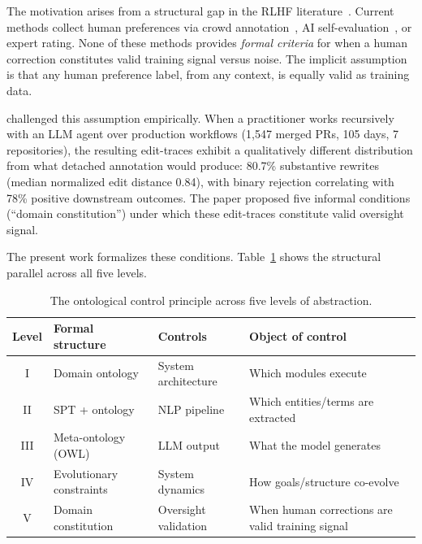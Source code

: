 \documentclass[11pt]{article}
\begin{document}
The motivation arises from a structural gap in the RLHF literature~\citep{christiano2017deep, ouyang2022training}.
Current methods collect human preferences via crowd annotation~\citep{ouyang2022training}, AI self-evaluation~\citep{bai2022constitutional, lee2023rlaif}, or expert rating.
None of these methods provides \emph{formal criteria} for when a human correction constitutes valid training signal versus noise.
The implicit assumption is that any human preference label, from any context, is equally valid as training data.

\citet{ovcharov2026edittrace} challenged this assumption empirically.
When a practitioner works recursively with an LLM agent over production workflows (1{,}547 merged PRs, 105 days, 7 repositories), the resulting edit-traces exhibit a qualitatively different distribution from what detached annotation would produce: 80.7\% substantive rewrites (median normalized edit distance 0.84), with binary rejection correlating with 78\% positive downstream outcomes.
The paper proposed five informal conditions (``domain constitution'') under which these edit-traces constitute valid oversight signal.

The present work formalizes these conditions.
Table~\ref{tab:levels} shows the structural parallel across all five levels.

\begin{table}[h]
\centering
\caption{The ontological control principle across five levels of abstraction.}
\label{tab:levels}
\begin{tabular}{@{}cp{3.5cm}p{3.5cm}p{3.5cm}@{}}
\toprule
\textbf{Level} & \textbf{Formal structure} & \textbf{Controls} & \textbf{Object of control} \\
\midrule
I   & Domain ontology          & System architecture     & Which modules execute \\
II  & SPT + ontology           & NLP pipeline            & Which entities/terms are extracted \\
III & Meta-ontology (OWL)      & LLM output              & What the model generates \\
IV  & Evolutionary constraints & System dynamics          & How goals/structure co-evolve \\
V   & Domain constitution      & Oversight validation     & When human corrections are valid training signal \\
\bottomrule
\end{tabular}
\end{table}
\end{document}
